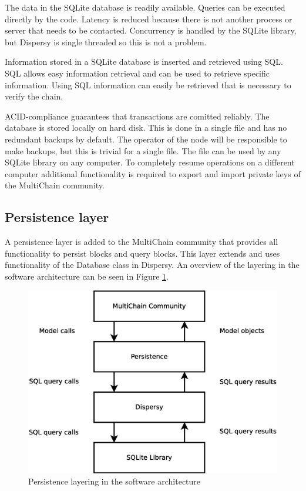 The data in the SQLite database is readily available.
Queries can be executed directly by the code.
Latency is reduced because there is not another process or server that needs to be contacted.
Concurrency is handled by the SQLite library,
but Dispersy is single threaded so this is not a problem.

Information stored in a SQLite database is inserted and retrieved using SQL\cite{date-sql}.
SQL allows easy information retrieval and can be used to retrieve specific information.
Using SQL information can easily be retrieved that is necessary to verify the chain.

ACID-compliance guarantees that transactions are comitted reliably.
The database is stored locally on hard disk.
This is done in a single file and has no redundant backups by default.
The operator of the node will be responsible to make backups,
but this is trivial for a single file.
The file can be used by any SQLite library on any computer.
To completely resume operations on a different computer
additional functionality is required to export and import private keys of the MultiChain community.

\subsection{Persistence layer}
A persistence layer is added to the MultiChain community
that provides all functionality to persist blocks and query blocks.
This layer extends and uses functionality of the Database class in Dispersy.
An overview of the layering in the software architecture can be seen in Figure \ref{fig:persistence-layer}.

\begin{figure}
	\centerline{\includegraphics[scale=0.3]{design/figs/persistence-layer.eps}}
	\caption{Persistence layering in the software architecture}
	\label{fig:persistence-layer}
\end{figure}

